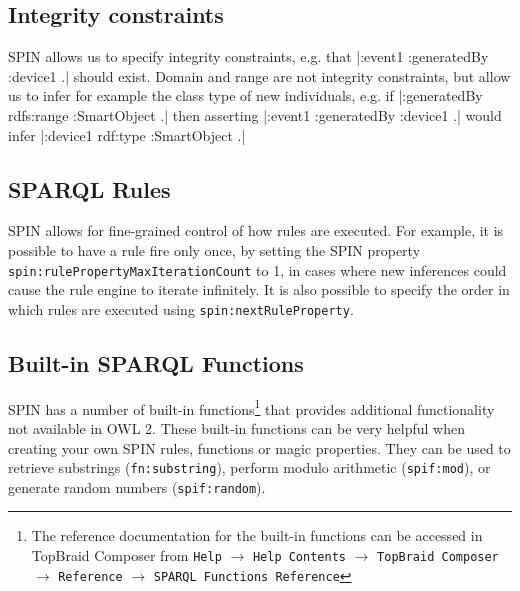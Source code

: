 \subsection{Integrity constraints}

\ac{SPIN} allows us to specify integrity constraints, e.g. that |:event1 :generatedBy :device1 .| should exist. Domain and range are not integrity constraints, but allow us to infer for example the class type of new individuals, e.g. if |:generatedBy rdfs:range :SmartObject .| then asserting |:event1 :generatedBy :device1 .| would infer |:device1 rdf:type :SmartObject .|




\subsection{SPARQL Rules}


\ac{SPIN} allows for fine-grained control of how rules are executed. For example, it is possible to have a rule fire only once, by setting the SPIN property \texttt{spin:rulePropertyMaxIterationCount} to 1, in cases where new inferences could cause the rule engine to iterate infinitely. It is also possible to specify the order in which rules are executed using \texttt{spin:nextRuleProperty}.


\subsection{Built-in SPARQL Functions}

\ac{SPIN} has a number of built-in functions\footnote{The reference documentation for the built-in functions can be accessed in TopBraid Composer from \texttt{Help} $\rightarrow$ \texttt{Help Contents} $\rightarrow$ \texttt{TopBraid Composer} $\rightarrow$ \texttt{Reference} $\rightarrow$ \texttt{SPARQL Functions Reference}} that provides additional functionality not available in \ac{OWL} 2. These built-in functions can be very helpful when creating your own \ac{SPIN} rules, functions or magic properties. They can be used to retrieve substrings (\texttt{fn:substring}), perform modulo arithmetic (\texttt{spif:mod}), or generate random numbers (\texttt{spif:random}).
	
